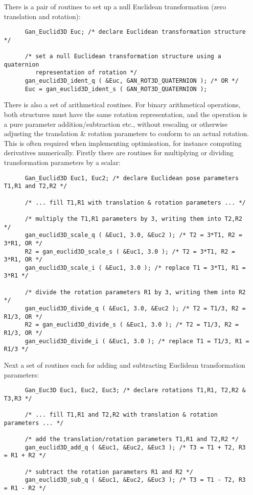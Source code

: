 There is a pair of routines to set up a null Euclidean transformation
(zero translation and rotation):
\begin{verbatim}
      Gan_Euclid3D Euc; /* declare Euclidean transformation structure */

      /* set a null Euclidean transformation structure using a quaternion
         representation of rotation */
      gan_euclid3D_ident_q ( &Euc, GAN_ROT3D_QUATERNION ); /* OR */
      Euc = gan_euclid3D_ident_s ( GAN_ROT3D_QUATERNION );
\end{verbatim}

There is also a set of arithmetical routines. For binary arithmetical
operations, both structures  must have the same rotation representation,
and the operation is a pure parameter addition/subtraction etc.,
without rescaling or otherwise adjusting the translation \&
rotation parameters to conform to an actual rotation.
This is often required when implementing optimisation, for instance computing
derivatives numerically.
Firstly there are routines for multiplying or dividing transformation
parameters by a scalar:
\begin{verbatim}
      Gan_Euclid3D Euc1, Euc2; /* declare Euclidean pose parameters T1,R1 and T2,R2 */

      /* ... fill T1,R1 with translation & rotation parameters ... */

      /* multiply the T1,R1 parameters by 3, writing them into T2,R2 */
      gan_euclid3D_scale_q ( &Euc1, 3.0, &Euc2 ); /* T2 = 3*T1, R2 = 3*R1, OR */
      R2 = gan_euclid3D_scale_s ( &Euc1, 3.0 ); /* T2 = 3*T1, R2 = 3*R1, OR */
      gan_euclid3D_scale_i ( &Euc1, 3.0 ); /* replace T1 = 3*T1, R1 = 3*R1 */

      /* divide the rotation parameters R1 by 3, writing them into R2 */
      gan_euclid3D_divide_q ( &Euc1, 3.0, &Euc2 ); /* T2 = T1/3, R2 = R1/3, OR */
      R2 = gan_euclid3D_divide_s ( &Euc1, 3.0 ); /* T2 = T1/3, R2 = R1/3, OR */
      gan_euclid3D_divide_i ( &Euc1, 3.0 ); /* replace T1 = T1/3, R1 = R1/3 */
\end{verbatim}

Next a set of routines each for adding and subtracting Euclidean transformation
parameters:
\begin{verbatim}
      Gan_Euc3D Euc1, Euc2, Euc3; /* declare rotations T1,R1, T2,R2 & T3,R3 */

      /* ... fill T1,R1 and T2,R2 with translation & rotation parameters ... */

      /* add the translation/rotation parameters T1,R1 and T2,R2 */
      gan_euclid3D_add_q ( &Euc1, &Euc2, &Euc3 ); /* T3 = T1 + T2, R3 = R1 + R2 */

      /* subtract the rotation parameters R1 and R2 */
      gan_euclid3D_sub_q ( &Euc1, &Euc2, &Euc3 ); /* T3 = T1 - T2, R3 = R1 - R2 */
\end{verbatim}

